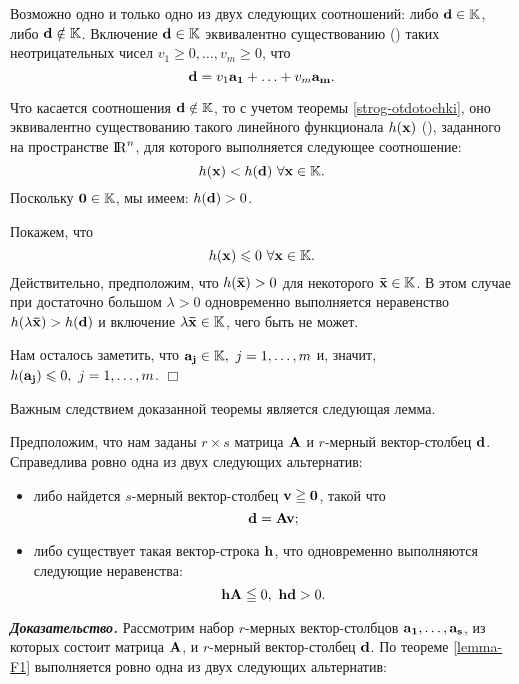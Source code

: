     Возможно одно и только одно из двух следующих соотношений: либо $\mathbf{d}\in\mathbb{K}$,
    либо $\mathbf{d}\notin\mathbb{K}$. Включение  $\mathbf{d}\in\mathbb{K}$
    эквивалентно существованию () таких неотрицательных чисел
    $v_{1}\geq0,\ldots,v_{m}\geq0$, что
    \[\mathbf{d}=v_{1}\mathbf{a_{1}}+\ldots+v_{m}\mathbf{a_{m}}.\]

    Что касается соотношения $\mathbf{d}\notin\mathbb{K}$, то с учетом
    теоремы \ref{strog-otdotochki}, оно эквивалентно существованию
    такого линейного функционала $h(\mathbf{x})$ (), заданного на пространстве ${\rm I\!R}^{n}$,
    для которого выполняется следующее соотношение:
\[
    h(\mathbf{x})< h(\mathbf{d}) \ \forall \mathbf{x}\in\mathbb{K}.
\]
    Поскольку $\mathbf{0}\in\mathbb{K}$, мы имеем: $h(\mathbf{d})>0$.

    Покажем, что
\[
    h(\vc{x})\leqslant0 \ \forall \vc{x}\in\mathbb{K}.
\]
    Действительно, предположим, что $h(\mathbf{\bar{x}})>0$ для некоторого
    $\mathbf{\bar{x}}\in\mathbb{K}$. В этом случае при достаточно
    большом $\lambda>0$ одновременно выполняется неравенство
    $h(\lambda\mathbf{\bar{x}})>h(\mathbf{d})$ и включение
    $\lambda\mathbf{\bar{x}}\in\mathbb{K}$, чего быть не может.

    Нам осталось заметить, что $\mathbf{a_{j}}\in\mathbb{K}, \ j=1,\ldots,m$ и, значит,
    $h(\vc{a_{j}})\leqslant0, \ j=1,\ldots,m$.
    $\Box$

    Важным следствием доказанной теоремы является следующая лемма.

\begin{lem}\label{lemma-F2}
    Предположим, что нам заданы $r\times s$ матрица $\mathbf{A}$ и
    $r$-мерный вектор-столбец $\mathbf{d}$. Справедлива ровно одна из двух
    следующих альтернатив:
\begin{itemize}
    \item [1)\ ] либо найдется $s$-мерный вектор-столбец $\mathbf{v}\geqq\mathbf{0}$,
    такой что
    \[\mathbf{d}=\mathbf{A}\mathbf{v};\]

    \item [2)\ ] либо существует такая вектор-строка $\mathbf{h}$, что
    одновременно выполняются следующие неравенства:
    \[\mathbf{h}\mathbf{A}\leqq0, \ \mathbf{h}\mathbf{d}>0.\]
    \end{itemize}
\end{lem}
    \textbf{\emph{Доказательство.}}
    Рассмотрим набор $r$-мерных
    вектор-столбцов $\mathbf{a_{1}},\ldots,\mathbf{a_{s}}$,  из которых состоит матрица
    $\mathbf{A}$, и $r$-мерный вектор-столбец $\mathbf{d}$. По теореме
    \ref{lemma-F1} выполняется ровно одна из двух следующих
    альтернатив:

